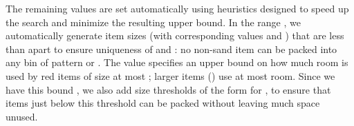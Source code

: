 \begin{table}[h]
	\caption{Parameters and item types used for \SonofH{}.}
	\label{tab:sonofharm}
	\centering
\end{table}

The remaining values  are set automatically  
using heuristics designed to speed up the search and minimize the
resulting upper bound. In the range , we automatically
generate item sizes (with corresponding values  and ) that are less than  apart to ensure uniqueness of 
and : no non-sand item can be packed into any bin of pattern  or . 
The value  specifies an upper bound on how much room is used by
red items of size at most ; larger items () use at most  room.
Since we have this bound , we also add size thresholds of the form  for , to ensure that items just below this threshold can be packed without leaving much space unused.

